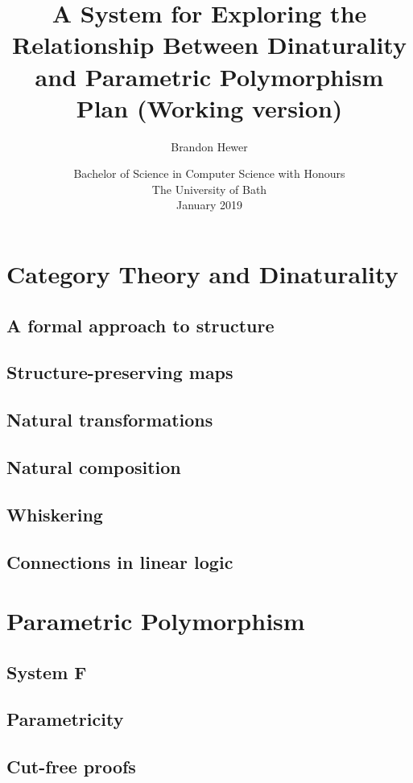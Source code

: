 \documentclass[11pt,openright,hidelinks,a4paper]{article}
\title{A System for Exploring the Relationship Between Dinaturality and Parametric Polymorphism\\\large{Plan (Working version)}}
\author{Brandon Hewer}
\date{Bachelor of Science in Computer Science with Honours\\The University of Bath\\January 2019}
\begin{document}
\setcounter{page}{0}

\maketitle

\newpage

\tableofcontents
\newpage

\setcounter{page}{1}

\section{Category Theory and Dinaturality}
\subsection{A formal approach to structure}
\subsection{Structure-preserving maps}
\subsection{Natural transformations}
\subsection{Natural composition}
\subsection{Whiskering}
\subsection{Connections in linear logic}

\section{Parametric Polymorphism}
\subsection{System F}
\subsection{Parametricity}
\subsection{Cut-free proofs}
\end{document}
